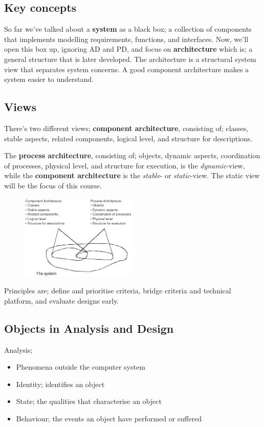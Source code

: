 \subsection{Key concepts}
So far we've talked about a \textbf{system} as a black box; a collection of components that implements modelling requirements, functions, and interfaces. Now, we'll open this box up, ignoring AD and PD, and focus on \textbf{architecture} which is; a general structure that is later developed. The architecture is a structural system view that separates system concerns. A good component architecture makes a system easier to understand. 

\subsection{Views}
There's two different views; \textbf{component architecture}, consisting of; classes, stable aspects, related components, logical level, and structure for descriptions. 

The \textbf{process architecture}, consisting of; objects, dynamic aspects, coordination of processes, physical level, and structure for execution, is the \textit{dynamic}-view, while the \textbf{component architecture} is the \textit{stable}- or \textit{static}-view. The static view will be the focus of this course.

\begin{figure}[H]
    \centering
    \includegraphics[width=0.5\textwidth]{figures/twoviews.png}
\end{figure}

\noindent Principles are; define and prioritise criteria, bridge criteria and technical platform, and evaluate designs early.

\subsection{Objects in Analysis and Design}
Analysis;
\begin{itemize}
    \item Phenomena outside the computer system
    \item Identity; identifies an object
    \item State; the qualities that characterise an object
    \item Behaviour; the events an object have performed or suffered
\end{itemize}

